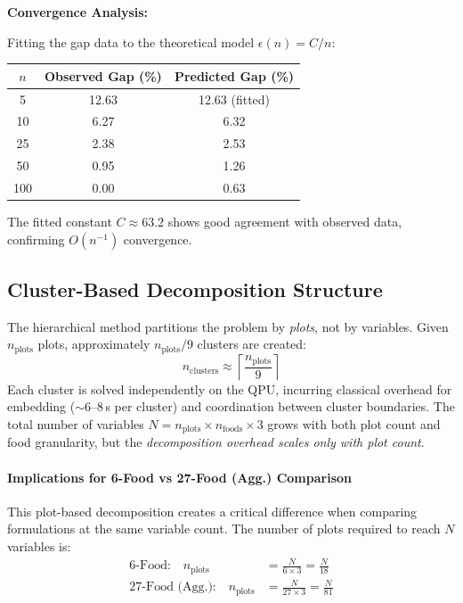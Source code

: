 \documentclass{oqireport}
\begin{document}
\textbf{Convergence Analysis:}

Fitting the gap data to the theoretical model $\epsilon(n) = C/n$:

\begin{center}
\begin{tabular}{ccc}
\hline
$n$ & Observed Gap (\%) & Predicted Gap (\%) \\
\hline
5 & 12.63 & 12.63 (fitted) \\
10 & 6.27 & 6.32 \\
25 & 2.38 & 2.53 \\
50 & 0.95 & 1.26 \\
100 & 0.00 & 0.63 \\
\hline
\end{tabular}
\end{center}

The fitted constant $C \approx 63.2$ shows good agreement with observed data, confirming $O(n^{-1})$ convergence.

\subsection{Cluster-Based Decomposition Structure}
\label{sub:clusterbased}

The hierarchical method partitions the problem by \emph{plots}, not by variables. Given $n_{\text{plots}}$ plots, approximately $n_{\text{plots}}/9$ clusters are created:
$$n_{\text{clusters}} \approx \left\lceil \frac{n_{\text{plots}}}{9} \right\rceil$$
Each cluster is solved independently on the QPU, incurring classical overhead for embedding ($\sim$6--8\,s per cluster) and coordination between cluster boundaries. The total number of variables $N = n_{\text{plots}} \times n_{\text{foods}} \times 3$ grows with both plot count and food granularity, but the \emph{decomposition overhead scales only with plot count}.

\paragraph{Implications for 6-Food vs 27-Food (Agg.) Comparison}

This plot-based decomposition creates a critical difference when comparing formulations at the same variable count. The number of plots required to reach $N$ variables is:
\begin{align}
    \text{6-Food:} \quad n_{\text{plots}} &= \frac{N}{6 \times 3} = \frac{N}{18} \\
    \text{27-Food (Agg.):} \quad n_{\text{plots}} &= \frac{N}{27 \times 3} = \frac{N}{81}
\end{align}
\end{document}
